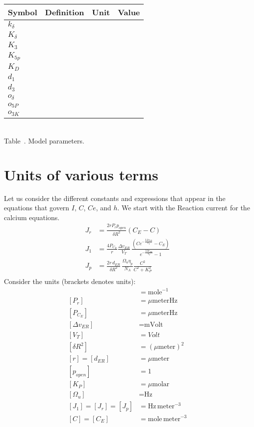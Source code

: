 \documentclass{article}
\begin{document}
\begin{center}
\begin{tabular}{|l|l|l|l|} 
\hline
Symbol & Definition & Unit & Value \\
\hline
$k_\delta$ &   &     & \\
$K_\delta$ &   &     & \\
$K_3$ &   &     & \\
$K_{5p}$ &   &     & \\
$K_D$ &   &     & \\
$d_1$ &   &     & \\
$d_3$ &   &     & \\
$o_\delta$ &   &     & \\
$o_{5P}$ &   &     & \\
$o_{3K}$ &   &     & \\
\hline
\end{tabular} \\
Table~\cite{tab_params}. Model parameters.
\end{center}

\section{Units of various terms}
Let us consider the different constants and expressions that appear in the equations that govern $I$, $C$, $Ce$, and $h$. 
We start with the Reaction current for the calcium equations. 
\newpage
\def\dvER{\Delta{v}_{ER}}
\def\dER{d_{ER}}
\def\dRtwo{\delta R^2}
\def\VVT{{V_T}}
\def\meter{\text{meter}}
\def\Hz{\text{Hz}}
\def\molar{\text{molar}}
\def\mole{\text{mole}}
\begin{align}
J_r &= \frac{2 r P_r p_{open}}{\dRtwo}   (C_E-C)  \\ %
J_1 &= \frac{4 P_{C_E}}{r}\frac{\dvER}{\VVT} \, \frac{(C e^{- \frac{2\dvER}{\VVT}} - C_E)}{e^{-\frac{2\dvER}{\VVT}}-1} \\ %
J_p &= \frac{2 r\, d_{ER}}{\dRtwo}  \,\frac{\Omega_u\eta_p}{N_A}   \frac{C^2}{C^2 + K_P^2} \\ %
\end{align}
Consider the units (brackets denotes units): 
\begin{align}
[N_A] &= \mole^{-1} \\
[P_r] &= \mu \meter \Hz \\
[P_{C_E}] &= \mu \meter \Hz \\
[\dvER] &= \text{mVolt} \\
[\VVT] &= Volt \\
[\dRtwo] &= (\mu\meter)^2 \\
[r] = [\dER] &= \mu\meter \\
[p_{open}] &= 1 \\
[K_P] &= \mu \molar \\
[\Omega_u] &= \Hz \\
[J_1] = [J_r] = [J_p] &= \Hz \, \meter^{-3} \\
[C] = [C_E] &= \mole \, \meter^{-3} 
\end{align}
\end{document}
